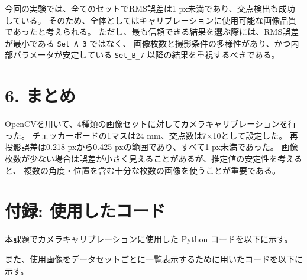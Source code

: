 \documentclass[11pt,a4paper]{ltjsarticle}
\begin{document}
今回の実験では、全てのセットでRMS誤差は1 px未満であり、交点検出も成功している。
そのため、全体としてはキャリブレーションに使用可能な画像品質であったと考えられる。
ただし、最も信頼できる結果を選ぶ際には、RMS誤差が最小である \texttt{Set\_A\_3} ではなく、
画像枚数と撮影条件の多様性があり、かつ内部パラメータが安定している
\texttt{Set\_B\_7} 以降の結果を重視するべきである。

\section*{6. まとめ}

OpenCVを用いて、4種類の画像セットに対してカメラキャリブレーションを行った。
チェッカーボードの1マスは24 mm、交点数は7$\times$10として設定した。
再投影誤差は0.218 pxから0.425 pxの範囲であり、すべて1 px未満であった。
画像枚数が少ない場合は誤差が小さく見えることがあるが、推定値の安定性を考えると、
複数の角度・位置を含む十分な枚数の画像を使うことが重要である。

\clearpage
\section*{付録: 使用したコード}

本課題でカメラキャリブレーションに使用した Python コードを以下に示す。



また、使用画像をデータセットごとに一覧表示するために用いたコードを以下に示す。


\end{document}
